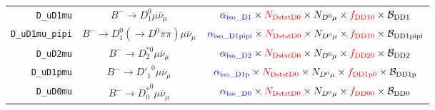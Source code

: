 \begin{landscape}
\begin{table}
\begin{tabular}{r|c|c}
        \texttt{D\_uD1mu} &                    $B^- \rightarrow D_1^0 \mu \overline{\nu}_\mu$                    &                                                                                                   $\textcolor{blue}{\alpha_\text{iso\_D1}} \times \textcolor{red}{N_\text{DststD0}} \times N_{D^0 \mu} \times \textcolor{red}{f_\text{DD10}} \times \mathcal{B}_\text{DD1}$                                                                                                   \\
  \texttt{D\_uD1mu\_pipi} &       $B^- \rightarrow D_1^0 (\rightarrow D^0 \pi\pi) \mu \overline{\nu}_\mu$        &                                                                                               $\textcolor{blue}{\alpha_\text{iso\_D1pipi}} \times \textcolor{red}{N_\text{DststD0}} \times N_{D^0 \mu} \times \textcolor{red}{f_\text{DD10}} \times \mathcal{B}_\text{DD1pipi}$                                                                                               \\
        \texttt{D\_uD2mu} &                  $B^- \rightarrow D_2^{*0} \mu \overline{\nu}_\mu$                   &                                                                                                   $\textcolor{blue}{\alpha_\text{iso\_D2}} \times \textcolor{red}{N_\text{DststD0}} \times N_{D^0 \mu} \times \textcolor{red}{f_\text{DD20}} \times \mathcal{B}_\text{DD2}$                                                                                                   \\
       \texttt{D\_uD1pmu} &                  $B^- \rightarrow {D'_1}^0 \mu \overline{\nu}_\mu$                   &                                                                                                 $\textcolor{blue}{\alpha_\text{iso\_D1p}} \times \textcolor{red}{N_\text{DststD0}} \times N_{D^0 \mu} \times \textcolor{red}{f_\text{DD1p0}} \times \mathcal{B}_\text{DD1p}$                                                                                                  \\
        \texttt{D\_uD0mu} &                  $B^- \rightarrow {D^*_0}^0 \mu \overline{\nu}_\mu$                  &                                                                                                   $\textcolor{blue}{\alpha_\text{iso\_D0}} \times \textcolor{red}{N_\text{DststD0}} \times N_{D^0 \mu} \times \textcolor{red}{f_\text{DD00}} \times \mathcal{B}_\text{DD0}$                                                                                                   \\

\end{tabular}
\end{table}
\end{landscape}
